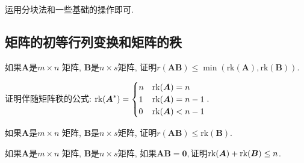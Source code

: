 \begin{sol*}
运用分块法和一些基础的操作即可. 
\end{sol*}

\subsection{矩阵的初等行列变换和矩阵的秩}
\begin{problem}
如果\textbf{$\boldsymbol{A}$}是$m\times n$ 矩阵, \textbf{$\boldsymbol{B}$}是$n\times s$矩阵,
证明$r(\boldsymbol{AB})\leq\min(\text{rk}(\boldsymbol{A}),\text{rk}(\boldsymbol{B}))$. 
\end{problem}

\begin{problem}
证明伴随矩阵秩的公式: $\text{rk}(\boldsymbol{A}^{*})=\begin{cases}
n & \text{rk}(\boldsymbol{A})=n\\
1 & \text{rk}(\boldsymbol{A})=n-1\\
0 & \text{rk}(\boldsymbol{A})<n-1
\end{cases}.$
\end{problem}

\begin{problem}
如果\textbf{$\boldsymbol{A}$}是$m\times n$ 矩阵, \textbf{$\boldsymbol{B}$}是$n\times s$矩阵,
证明$r(\boldsymbol{AB})\leq\text{rk}(\boldsymbol{B})$.
\end{problem}

\begin{problem}
如果\textbf{$\boldsymbol{A}$}是$m\times n$ 矩阵, \textbf{$\boldsymbol{B}$}是$n\times s$矩阵,
如果$\boldsymbol{AB=0},$证明$\text{rk}(\boldsymbol{A})+\text{rk}(\boldsymbol{B})\leq n$. 
\end{problem}


